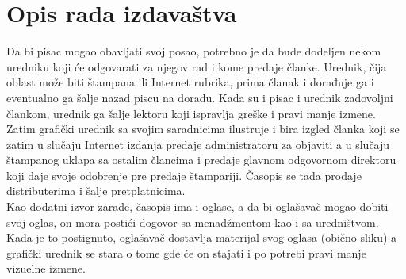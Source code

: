\section*{Opis rada izdavaštva}

Da bi pisac mogao obavljati svoj posao, potrebno je da bude dodeljen nekom uredniku koji će odgovarati za njegov rad i kome predaje članke. Urednik, čija oblast može biti štampana ili Internet rubrika, prima članak i dorađuje ga i eventualno ga šalje nazad piscu na doradu. Kada su i pisac i urednik zadovoljni člankom, urednik ga šalje lektoru koji ispravlja greške i pravi manje izmene. \\

Zatim grafički urednik sa svojim saradnicima ilustruje i bira izgled članka koji se zatim u slučaju Internet izdanja predaje administratoru za objaviti a u slučaju štampanog uklapa sa ostalim člancima i predaje glavnom odgovornom direktoru koji daje svoje odobrenje pre predaje štampariji. Časopis se tada prodaje distributerima i šalje pret\-plat\-ni\-ci\-ma. \\

Kao dodatni izvor zarade, časopis ima i oglase, a da bi oglašavač mogao dobiti svoj oglas, on mora postići dogovor sa menadžmentom kao i sa uredništvom. Kada je to postignuto, oglašavač dostavlja materijal svog oglasa (obično sliku) a grafički urednik se stara o tome gde će on stajati i po potrebi pravi manje vizuelne izmene. \\
